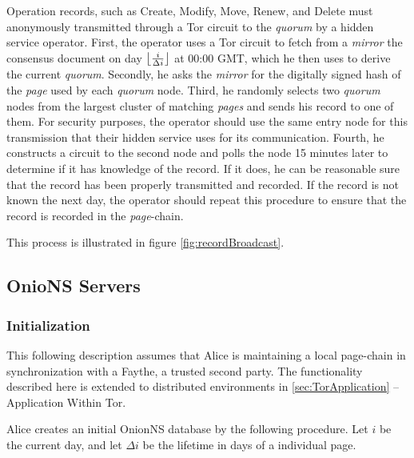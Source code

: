 
Operation records, such as Create, Modify, Move, Renew, and Delete must anonymously transmitted through a Tor circuit to the \emph{quorum} by a hidden service operator. First, the operator uses a Tor circuit to fetch from a \emph{mirror} the consensus document on day $ \floor[\big]{\frac{i}{\Delta i}} $ at 00:00 GMT, which he then uses to derive the current \emph{quorum}. Secondly, he asks the \emph{mirror} for the digitally signed hash of the \emph{page} used by each \emph{quorum} node. Third, he randomly selects two \emph{quorum} nodes from the largest cluster of matching \emph{pages} and sends his record to one of them. For security purposes, the operator should use the same entry node for this transmission that their hidden service uses for its communication. Fourth, he constructs a circuit to the second node and polls the node 15 minutes later to determine if it has knowledge of the record. If it does, he can be reasonable sure that the record has been properly transmitted and recorded. If the record is not known the next day, the operator should repeat this procedure to ensure that the record is recorded in the \emph{page}-chain.

This process is illustrated in figure \ref{fig:recordBroadcast}.

\subsection{OnioNS Servers}

\subsubsection{Initialization}

This following description assumes that Alice is maintaining a local page-chain in synchronization with a Faythe, a trusted second party. The functionality described here is extended to distributed environments in \ref{sec:TorApplication} -- Application Within Tor.


Alice creates an initial OnionNS database by the following procedure. Let $ i $ be the current day, and let $ \Delta i $ be the lifetime in days of a individual page.

